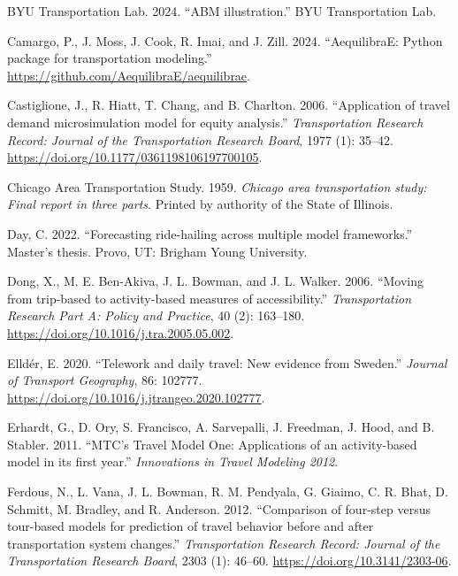 \documentclass[fancy, oneside, mastersfancy, ms]{byuthesis}
\newlength{\cslhangindent}
\newenvironment{CSLReferences}[2] %
 {\begin{list}{}{%
  \setlength{\itemindent}{0pt}
  \setlength{\leftmargin}{0pt}
  \setlength{\parsep}{0pt}
  \ifodd #1
   \setlength{\leftmargin}{\cslhangindent}
   \setlength{\itemindent}{-1\cslhangindent}
  \fi
  \setlength{\itemsep}{#2\baselineskip}}}
 {\end{list}}
\begin{document}
\begin{CSLReferences}{1}{0}
BYU Transportation Lab. 2024. {``{ABM} illustration.''} BYU
Transportation Lab.

Camargo, P., J. Moss, J. Cook, R. Imai, and J. Zill. 2024.
{``{AequilibraE}: Python package for transportation modeling.''}
\url{https://github.com/AequilibraE/aequilibrae}.

Castiglione, J., R. Hiatt, T. Chang, and B. Charlton. 2006.
{``Application of travel demand microsimulation model for equity
analysis.''} \emph{Transportation Research Record: Journal of the
Transportation Research Board}, 1977 (1): 35--42.
\url{https://doi.org/10.1177/0361198106197700105}.

Chicago Area Transportation Study. 1959. \emph{Chicago area
transportation study: Final report in three parts}. Printed by authority
of the State of Illinois.

Day, C. 2022. {``Forecasting ride-hailing across multiple model
frameworks.''} Master's thesis. Provo, UT: Brigham Young University.

Dong, X., M. E. Ben-Akiva, J. L. Bowman, and J. L. Walker. 2006.
{``Moving from trip-based to activity-based measures of
accessibility.''} \emph{Transportation Research Part A: Policy and
Practice}, 40 (2): 163--180.
\url{https://doi.org/10.1016/j.tra.2005.05.002}.

Elldér, E. 2020. {``Telework and daily travel: New evidence from
{Sweden}.''} \emph{Journal of Transport Geography}, 86: 102777.
\url{https://doi.org/10.1016/j.jtrangeo.2020.102777}.

Erhardt, G., D. Ory, S. Francisco, A. Sarvepalli, J. Freedman, J. Hood,
and B. Stabler. 2011. {``{MTC}'s {Travel Model One}: Applications of an
activity-based model in its first year.''} \emph{Innovations in Travel
Modeling 2012}.

Ferdous, N., L. Vana, J. L. Bowman, R. M. Pendyala, G. Giaimo, C. R.
Bhat, D. Schmitt, M. Bradley, and R. Anderson. 2012. {``Comparison of
four-step versus tour-based models for prediction of travel behavior
before and after transportation system changes.''} \emph{Transportation
Research Record: Journal of the Transportation Research Board}, 2303
(1): 46--60. \url{https://doi.org/10.3141/2303-06}.


\end{CSLReferences}
\end{document}
